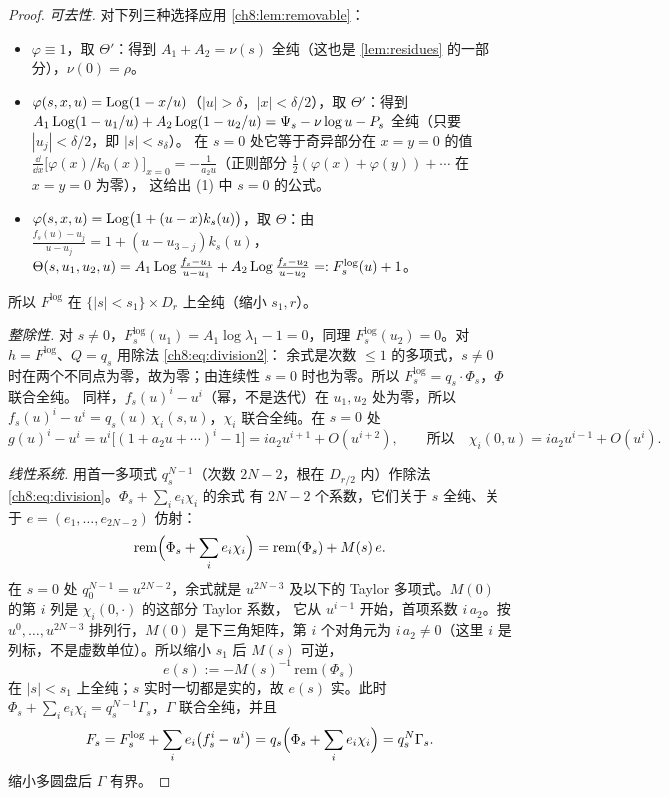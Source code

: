\begin{proof}
\emph{可去性.} 对下列三种选择应用 \cref{ch8:lem:removable}：
\begin{itemize}
\item $\varphi\equiv1$，取 $\Theta'$：得到 $A_1+A_2=\nu(s)$ 全纯（这也是 \cref{lem:residues} 的一部分），$\nu(0)=\rho$。
\item $\varphi(s,x,u)=\operatorname{Log}(1-x/u)$（$|u|>\delta$，$|x|<\delta/2$），取 $\Theta'$：得到
  $A_1\operatorname{Log}(1-u_1/u)+A_2\operatorname{Log}(1-u_2/u)=\Psi_s-\nu\log u-P_s$ 全纯（只要 $|u_j|<\delta/2$，即 $|s|<s_\delta$）。
  在 $s=0$ 处它等于奇异部分在 $x=y=0$ 的值 $\frac{\dd}{\dd x}\bigl[\varphi(x)/k_0(x)\bigr]_{x=0}=-\frac1{a_2u}$（正则部分 $\frac12(\varphi(x)+\varphi(y))+\cdots$ 在 $x=y=0$ 为零），
  这给出 (1) 中 $s=0$ 的公式。
\item $\varphi(s,x,u)=\operatorname{Log}\bigl(1+(u-x)k_s(u)\bigr)$，取 $\Theta$：由 $\frac{f_s(u)-u_j}{u-u_j}=1+(u-u_{3-j})k_s(u)$，
  $\Theta(s,u_1,u_2,u)=A_1\operatorname{Log}\frac{f_s-u_1}{u-u_1}+A_2\operatorname{Log}\frac{f_s-u_2}{u-u_2}=:F^{\log}_s(u)+1$。
\end{itemize}
所以 $F^{\log}$ 在 $\{|s|<s_1\}\times D_r$ 上全纯（缩小 $s_1,r$）。

\emph{整除性.} 对 $s\ne0$，$F^{\log}_s(u_1)=A_1\log\lambda_1-1=0$，同理 $F^{\log}_s(u_2)=0$。对 $h=F^{\log}$、$Q=q_s$ 用除法 \eqref{ch8:eq:division2}：
余式是次数 $\le1$ 的多项式，$s\ne0$ 时在两个不同点为零，故为零；由连续性 $s=0$ 时也为零。所以 $F^{\log}_s=q_s\cdot\Phi_s$，$\Phi$ 联合全纯。
同样，$f_s(u)^i-u^i$（幂，不是迭代）在 $u_1,u_2$ 处为零，所以 $f_s(u)^i-u^i=q_s(u)\,\chi_i(s,u)$，$\chi_i$ 联合全纯。在 $s=0$ 处
\[
 g(u)^i-u^i=u^i\bigl[(1+a_2u+\cdots)^i-1\bigr]=ia_2u^{i+1}+O(u^{i+2}),\qquad\text{所以}\quad \chi_i(0,u)=ia_2u^{i-1}+O(u^i).
\]

\emph{线性系统.} 用首一多项式 $q_s^{N-1}$（次数 $2N-2$，根在 $D_{r/2}$ 内）作除法 \eqref{ch8:eq:division}。$\Phi_s+\sum_ie_i\chi_i$ 的余式
有 $2N-2$ 个系数，它们关于 $s$ 全纯、关于 $e=(e_1,\dots,e_{2N-2})$ 仿射：
\[
 \mathrm{rem}\Bigl(\Phi_s+\sum_ie_i\chi_i\Bigr)=\mathrm{rem}(\Phi_s)+M(s)\,e .
\]
在 $s=0$ 处 $q_0^{N-1}=u^{2N-2}$，余式就是 $u^{2N-3}$ 及以下的 Taylor 多项式。$M(0)$ 的第 $i$ 列是 $\chi_i(0,\cdot)$ 的这部分 Taylor 系数，
它从 $u^{i-1}$ 开始，首项系数 $i\,a_2$。按 $u^0,\dots,u^{2N-3}$ 排列行，$M(0)$ 是下三角矩阵，第 $i$ 个对角元为 $i\,a_2\ne0$（这里 $i$ 是列标，不是虚数单位）。所以缩小 $s_1$ 后 $M(s)$ 可逆，
\[
 e(s):=-M(s)^{-1}\,\mathrm{rem}(\Phi_s)
\]
在 $|s|<s_1$ 上全纯；$s$ 实时一切都是实的，故 $e(s)$ 实。此时 $\Phi_s+\sum_ie_i\chi_i=q_s^{N-1}\Gamma_s$，$\Gamma$ 联合全纯，并且
\[
 F_s=F^{\log}_s+\sum_ie_i\bigl(f_s^i-u^i\bigr)=q_s\Bigl(\Phi_s+\sum_ie_i\chi_i\Bigr)=q_s^N\Gamma_s .
\]
缩小多圆盘后 $\Gamma$ 有界。


\end{proof}
